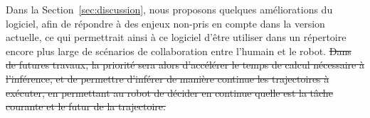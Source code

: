 \documentclass[utf8]{frontiersSCNS} %
\begin{document}
Dans la Section~\ref{sec:discussion}, nous proposons quelques améliorations du logiciel, afin de répondre à des enjeux non-pris en compte dans la version actuelle, ce qui permettrait ainsi à ce logiciel d'être utiliser dans un répertoire encore plus large de scénarios de collaboration entre l'humain et le robot. \sout{Dans de futures travaux, la priorité sera alors d'accélérer le temps de calcul nécessaire à l'inférence, et de permettre d'inférer de manière continue les trajectoires à exécuter, en permettant au robot de décider en continue quelle est la tâche courante et le futur de la trajectoire.}


\end{document}
